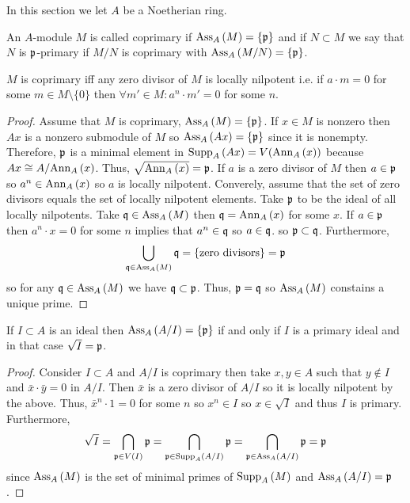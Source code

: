 \documentclass[12pt]{article}
\begin{document}
\begin{rmk}
In this section we let $A$ be a Noetherian ring.
\end{rmk}

\begin{definition}
An $A$-module $M$ is called coprimary if $\mathrm{Ass}_{A}\left( M \right) = \{\mathfrak{p}\}$ and if $N \subset M$ we say that $N$ is $\mathfrak{p}$-primary if $M / N$ is coprimary with $\mathrm{Ass}_{A}\left( M/N \right) = \{ \mathfrak{p} \}$.  
\end{definition}

\begin{lemma}
$M$ is coprimary iff any zero divisor of $M$ is locally nilpotent i.e. if $a \cdot m = 0$ for some $m \in M \setminus \{0\}$ then $\forall m' \in M : a^n \cdot m' = 0$ for some $n$. 
\end{lemma}

\begin{proof}
Assume that $M$ is coprimary, $\mathrm{Ass}_{A}\left( M \right) = \{ \mathfrak{p} \}$. If $x \in M$ is nonzero then $Ax$ is a nonzero submodule of $M$ so $\mathrm{Ass}_{A}\left( Ax \right) = \{ \mathfrak{p} \}$ since it is nonempty. Therefore, $\mathfrak{p}$ is a minimal element in $\mathrm{Supp}_{A}\left(A x \right) = V(\mathrm{Ann}_{A}\left(x\right))$
because $Ax \cong A / \mathrm{Ann}_{A}\left(x\right)$. Thus, $\sqrt{\mathrm{Ann}_{A}\left(x\right)} = \mathfrak{p}$. If $a$ is a zero divisor of $M$ then $a \in \mathfrak{p}$ so $a^n \in \mathrm{Ann}_{A}\left(x\right)$ so $a$ is locally nilpotent. Converely, assume that the set of zero divisors equals the set of locally nilpotent elements. Take $\mathfrak{p}$ to be the ideal of all locally nilpotents. Take $\mathfrak{q} \in \mathrm{Ass}_{A}\left( M \right)$ then $\mathfrak{q} = \mathrm{Ann}_{A}\left(x\right)$ for some $x$. If $a \in \mathfrak{p}$ then $a^n \cdot x = 0$ for some $n$ implies that $a^n \in \mathfrak{q}$ so $a \in \mathfrak{q}$. so $\mathfrak{p} \subset \mathfrak{q}$. Furthermore,
\[ \bigcup_{\mathfrak{q} \in \mathrm{Ass}_{A}\left( M \right)} \mathfrak{q} = \{ \text{zero divisors} \} = \mathfrak{p} \]
so for any $\mathfrak{q} \in \mathrm{Ass}_{A}\left( M \right)$ we have $\mathfrak{q} \subset \mathfrak{p}$. Thus, $\mathfrak{p} = \mathfrak{q}$ so $\mathrm{Ass}_{A}\left( M \right)$ constains a unique prime.
\end{proof}

\begin{corollary}
If $I \subset A$ is an ideal then $\mathrm{Ass}_{A}\left( A / I \right) = \{ \mathfrak{p} \}$ if and only if $I$ is a primary ideal and in that case $\sqrt{I} = \mathfrak{p}$. 
\end{corollary}

\begin{proof}
Consider $I \subset A$ and $A / I$ is coprimary then take $x,y \in A$ such that $y \notin I$ and $\bar{x} \cdot \bar{y} = 0$ in $A / I$. Then $\bar{x}$ is a zero divisor of $A / I$ so it is locally nilpotent by the above. Thus, $\bar{x}^n \cdot 1 = 0$ for some $n$ so $x^n \in I$ so $x \in \sqrt{I}$ and thus $I$ is primary. Furthermore,
\[ \sqrt{I} = \bigcap_{\mathfrak{p} \in V(I)} \mathfrak{p} = \bigcap_{\mathfrak{p} \in \mathrm{Supp}_{A}\left(A / I \right)} \mathfrak{p} = \bigcap_{\mathfrak{p} \in \mathrm{Ass}_{A}\left( A / I \right)} \mathfrak{p} = \mathfrak{p} \]
since $\mathrm{Ass}_{A}\left( M \right)$ is the set of minimal primes of $\mathrm{Supp}_{A}\left(M \right)$ and $\mathrm{Ass}_{A}\left( A / I \right) = \mathfrak{p}$.  
\end{proof}
\end{document}

